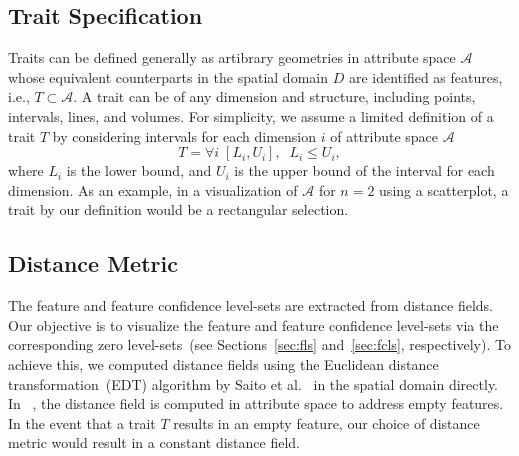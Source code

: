 \subsection{Trait Specification}
Traits can be defined generally as artibrary geometries in attribute space $\mathcal{A}$ whose equivalent counterparts in the spatial domain $D$ are identified as features, i.e., $T\subset\mathcal{A}$.
%
A trait can be of any dimension and structure, including points, intervals, lines, and volumes.
%
%
For simplicity, we assume a limited definition of a trait $T$ by considering intervals for each dimension $i$ of attribute space $\mathcal{A}$
%
\begin{equation}	
T = \forall{i}\;[L_{i}, U_{i}], \;\;L_{i} \leqslant U_{i}, 
\end{equation}
where $L_{i}$ is the lower bound, and $U_{i}$ is the upper bound of the interval for each dimension.
%
As an example, in a visualization of $\mathcal{A}$ for $n = 2$ using a scatterplot, a trait by our definition would be a rectangular selection.

\vspace{-2mm}
\subsection{Distance Metric}
%

The feature and feature confidence level-sets are extracted from distance fields.
%
Our objective is to visualize the feature and feature confidence level-sets via the corresponding zero level-sets~(see Sections~\ref{sec:fls} and~\ref{sec:fcls}, respectively). 
%
To achieve this, we computed distance fields using the Euclidean distance transformation~(EDT) algorithm by Saito et al.~\cite{saito1994new} in the spatial domain directly.
%
%
In ~\cite{jankowai2020feature}, the distance field is computed in attribute space to address empty features.
%
In the event that a trait $T$ results in an empty feature, our choice of distance metric would result in a constant distance field.
%


